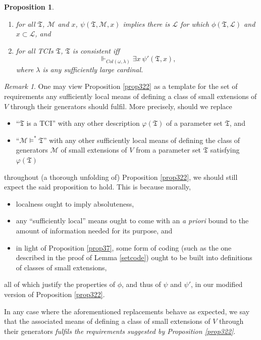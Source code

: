 \documentclass[12pt, twoside]{memoir}
\numberwithin{equation}{section}
\newtheorem{prop}[thm]{Proposition}
\theoremstyle{definition}
\theoremstyle{remark}
\newtheorem{rem}[thm]{Remark}
\theoremstyle{definition}
\theoremstyle{definition}
\theoremstyle{definition}
\theoremstyle{remark}
\begin{document}
\begin{prop}
\begin{enumerate}[label=(\arabic*)]
\begin{equation*}
        \{x \in \mathcal{P}(\mathcal{L}) : \psi(\mathfrak{T}, \mathcal{M}, x)\}
    \end{equation*}
    is absolute for outer models of $V$,
    \item\label{3246} for all $\mathfrak{T}$, $\mathcal{M}$ and $x$, $\psi(\mathfrak{T}, \mathcal{M}, x)$ implies there is $\mathcal{L}$ for which $\phi(\mathfrak{T}, \mathcal{L})$ and $x \subset \mathcal{L}$, and
    \item\label{9258} for all TCIs $\mathfrak{T}$, $\mathfrak{T}$ is consistent iff $$\Vdash_{Col(\omega, \lambda)} \exists x \ \psi'(\mathfrak{T}, x) \text{,}$$ where $\lambda$ is any sufficiently large cardinal.
\end{enumerate}
\end{prop}

\begin{rem}\label{rem926}
One may view Proposition \ref{prop322} as a template for the set of requirements any sufficiently local means of defining a class of small extensions of $V$ through their generators should fulfil. More precisely, should we replace 
\begin{itemize}
    \item ``$\mathfrak{T}$ is a TCI'' with any other description $\varphi(\mathfrak{T})$ of a parameter set $\mathfrak{T}$, and
    \item ``$\mathcal{M} \models^* \mathfrak{T}$'' with any other sufficiently local means of defining the class of generators $\mathcal{M}$ of small extensions of $V$ from a parameter set $\mathfrak{T}$ satisfying $\varphi(\mathfrak{T})$
\end{itemize}
throughout (a thorough unfolding of) Proposition \ref{prop322}, we should still expect the said proposition to hold. This is because morally, 
\begin{itemize}
    \item localness ought to imply absoluteness, 
    \item any ``sufficiently local'' means ought to come with an \textit{a priori} bound to the amount of information needed for its purpose, and
    \item in light of Proposition \ref{prop37}, some form of coding (such as the one described in the proof of Lemma \ref{setcode}) ought to be built into definitions of classes of small extensions, 
\end{itemize}
all of which justify the properties of $\phi$, and thus of $\psi$ and $\psi'$, in our modified version of Proposition \ref{prop322}.

In any case where the aforementioned replacements behave as expected, we say that the associated means of defining a class of small extensions of $V$ through their generators \textit{fulfils the requirements suggested by Proposition \ref{prop322}}.
\end{rem}
\end{document}
